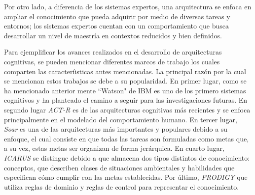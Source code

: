 Por otro lado, a diferencia de los sistemas expertos, una arquitectura se enfoca en ampliar el conocimiento que pueda adquirir por medio de diversas tareas y entornos; los sistemas expertos cuentan con un comportamiento que busca desarrollar un nivel de maestr\'{i}a en contextos reducidos y bien definidos.

Para ejemplificar los avances realizados en el desarrollo de arquitecturas cognitivas, se pueden mencionar diferentes marcos de trabajo los cuales comparten las caracter\'{i}isticas antes mencionadas. La principal raz\'{o}n por la cual se mencionan estos trabajos se debe a su popularidad. En primer lugar, como se ha mencionado anterior mente “Watson" de IBM es uno de los primero sistemas cognitivos y ha planteado el camino a seguir para las investigaciones futuras. En segundo lugar \emph{ACT-R} \cite{anderson1997act} es de las arquitecturas cognitivas m\'{a}s recientes y se enfoca principalmente en el modelado del comportamiento humano. En tercer lugar, \emph{Soar} \cite{soar1987} es una de las arquitecturas m\'{a}s importantes y populares debido a su enfoque, el cual consiste en que todas las tareas son formuladas como metas que, a su vez, estas metas ser organizan de forma jer\'{a}rquica. En cuarto lugar, \emph{ICARUS} \cite{langley1991design} se distingue debido a que almacena dos tipos distintos de conocimiento: conceptos, que describen clases de situaciones ambientales y habilidades que especifican c\'{o}mo cumplir con las metas establecidas. Por \'{ultimo}, \emph{PRODIGY} \cite{carbonell1991prodigy} que utiliza reglas de dominio y reglas de control para representar el conocimiento.


